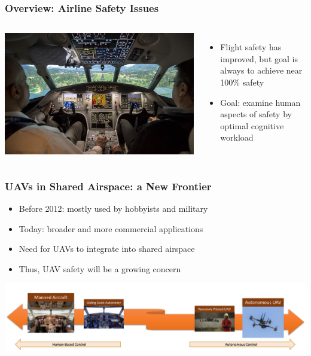 \documentclass{beamer}
\begin{document}
\begin{frame}
\frametitle{Overview: Airline Safety Issues}
\begin{columns}[c]
\includegraphics[width=\textwidth]{flight}
\begin{itemize}
\item{Flight safety has improved, but goal is always to achieve near 100\% safety}
\item{Goal: examine human aspects of safety by optimal cognitive workload}
\end{itemize}
\end{columns}
\end{frame}

\begin{frame}
\frametitle{UAVs in Shared Airspace: a New Frontier}
\begin{itemize}
\item{Before 2012: mostly used by hobbyists and military}
\item{Today: broader and more commercial applications}
\item{Need for UAVs to integrate into shared airspace}
\item{Thus, UAV safety will be a growing concern}
\end{itemize}
\includegraphics[width=\textwidth]{overview}
\end{frame}
\end{document}
